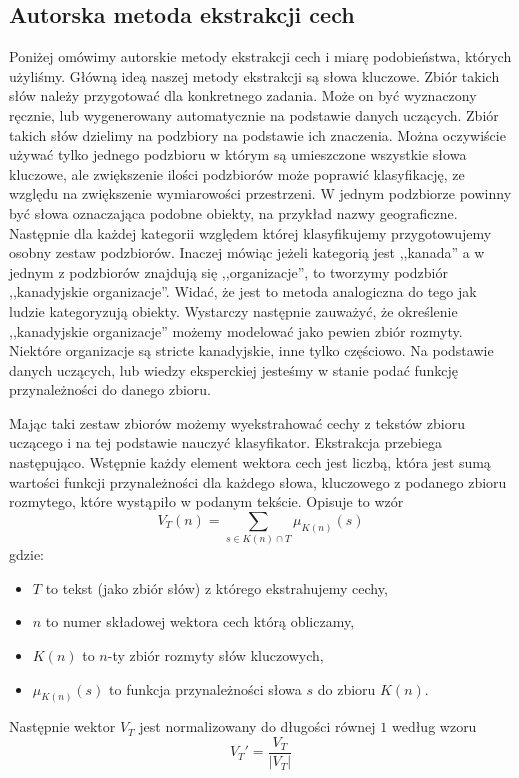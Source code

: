 \documentclass[a4paper]{classrep}
\begin{document}
\subsection{Autorska metoda ekstrakcji cech}
\label{sec:autorska}
Poniżej omówimy autorskie metody ekstrakcji cech i miarę podobieństwa, których użyliśmy. 
Główną ideą naszej metody ekstrakcji są słowa kluczowe. Zbiór takich słów należy przygotować dla konkretnego zadania. Może on być wyznaczony ręcznie,
lub wygenerowany automatycznie na podstawie danych uczących. Zbiór takich słów dzielimy na podzbiory na podstawie ich znaczenia. Można oczywiście używać tylko jednego podzbioru
w którym są umieszczone wszystkie słowa kluczowe, ale zwiększenie ilości podzbiorów może poprawić klasyfikację, ze względu na zwiększenie wymiarowości przestrzeni. 
W jednym podzbiorze powinny być słowa oznaczająca podobne obiekty, na przykład nazwy geograficzne. Następnie dla każdej kategorii względem której klasyfikujemy przygotowujemy
osobny zestaw podzbiorów. Inaczej mówiąc jeżeli kategorią jest ,,kanada'' a w jednym z podzbiorów znajdują się ,,organizacje'', to tworzymy podzbiór ,,kanadyjskie organizacje''.
Widać, że jest to metoda analogiczna do tego jak ludzie kategoryzują obiekty. Wystarczy następnie zauważyć, że określenie ,,kanadyjskie organizacje'' możemy modelować
jako pewien zbiór rozmyty. Niektóre organizacje są stricte kanadyjskie, inne tylko częściowo. Na podstawie danych uczących, lub wiedzy eksperckiej jesteśmy w stanie podać
funkcję przynależności do danego zbioru.

Mając taki zestaw zbiorów możemy wyekstrahować cechy z tekstów zbioru uczącego i na tej podstawie nauczyć klasyfikator. Ekstrakcja przebiega następująco. Wstępnie każdy element wektora
cech jest liczbą, która jest sumą wartości funkcji przynależności dla każdego słowa, kluczowego z podanego zbioru rozmytego, które wystąpiło w podanym tekście.
Opisuje to wzór
\begin{equation}
V_T(n)=\sum_{s\in K(n) \cap T} \mu_{K(n)}(s)
\end{equation}
gdzie:
\begin{itemize}
\item \(T\) to tekst (jako zbiór słów) z którego ekstrahujemy cechy,
\item \(n\) to numer składowej wektora cech którą obliczamy,
\item \(K(n)\) to \(n\)-ty zbiór rozmyty słów kluczowych,
\item \(\mu_{K(n)}(s)\) to funkcja przynależności słowa \(s\) do zbioru \(K(n)\).
\end{itemize}
\noindent Następnie wektor \(V_T\) jest normalizowany do długości równej \(1\) według wzoru
\begin{equation}
V_T' = \frac{V_T}{|V_T|}
\end{equation}
\end{document}
